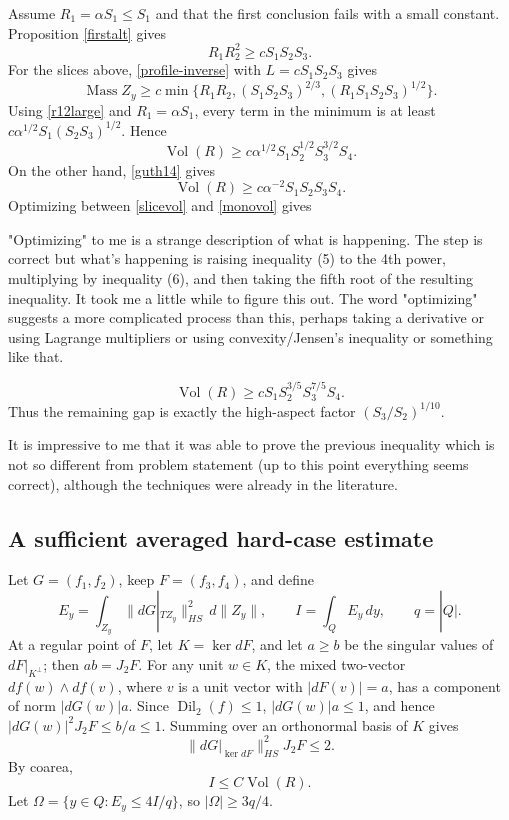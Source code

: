 \documentclass[12pt]{article}
\newcommand{\Dil}{\operatorname{Dil}}
\newcommand{\Vol}{\operatorname{Vol}}
\newcommand{\Mass}{\operatorname{Mass}}
\newcommand{\review}[1]{\begin{reviewbox}#1\end{reviewbox}}
\begin{document}
Assume \(R_1=\alpha S_1\le S_1\) and that the first conclusion fails with a
small constant.  Proposition \ref{firstalt} gives
\begin{equation}\label{r12large}
        R_1R_2^2\ge cS_1S_2S_3 .
\end{equation}
For the slices above, \eqref{profile-inverse} with
\(L=cS_1S_2S_3\) gives
\[
\Mass Z_y\ge c\min\{R_1R_2,(S_1S_2S_3)^{2/3},
                         (R_1S_1S_2S_3)^{1/2}\}.
\]
Using \eqref{r12large} and \(R_1=\alpha S_1\), every term in the minimum is
at least \(c\alpha^{1/2}S_1(S_2S_3)^{1/2}\).  Hence
\begin{equation}\label{slicevol}
        \Vol(R)\ge
        c\alpha^{1/2}S_1S_2^{1/2}S_3^{3/2}S_4 .
\end{equation}
On the other hand, \eqref{guth14} gives
\begin{equation}\label{monovol}
        \Vol(R)\ge
        c\alpha^{-2}S_1S_2S_3S_4 .
\end{equation}
Optimizing between \eqref{slicevol} and \eqref{monovol} gives \review{"Optimizing" to me is a strange description of what is happening.  The step is correct but what's happening is raising inequality (5) to the 4th power, multiplying by inequality (6), and then taking the fifth root of the resulting inequality. It took me a little while to figure this out.  The word "optimizing" suggests a more complicated process than this, perhaps taking a derivative or using Lagrange multipliers or using convexity/Jensen's inequality or something like that.}
\[
        \Vol(R)\ge cS_1S_2^{3/5}S_3^{7/5}S_4 .
\]
Thus the remaining gap is exactly the high-aspect factor
\((S_3/S_2)^{1/10}\).

\review{It is impressive to me that it was able to prove the previous inequality which is not so different from problem statement (up to this point everything seems correct), although the techniques were already in the literature.  }

\subsection*{A sufficient averaged hard-case estimate}

Let \(G=(f_1,f_2)\), keep \(F=(f_3,f_4)\), and define
\[
E_y=\int_{Z_y}\|dG|_{TZ_y}\|_{HS}^2\,d\|Z_y\|,\qquad
I=\int_QE_y\,dy,\qquad q=|Q|.
\]
At a regular point of \(F\), let \(K=\ker dF\), and let \(a\ge b\) be the
singular values of \(dF|_{K^\perp}\); then \(ab=J_2F\).  For any unit
\(w\in K\), the mixed two-vector \(df(w)\wedge df(v)\), where \(v\) is a
unit vector with \(|dF(v)|=a\), has a component of norm
\(|dG(w)|a\).  Since \(\Dil_2(f)\le1\), \(|dG(w)|a\le1\), and hence
\(|dG(w)|^2J_2F\le b/a\le1\).  Summing over an orthonormal basis of \(K\)
gives
\[
        \|dG|_{\ker dF}\|_{HS}^2J_2F\le2 .
\]
By coarea,
\begin{equation}\label{Icoarea}
        I\le C\Vol(R).
\end{equation}
Let \(\Omega=\{y\in Q:E_y\le4I/q\}\), so \(|\Omega|\ge3q/4\).
\end{document}

